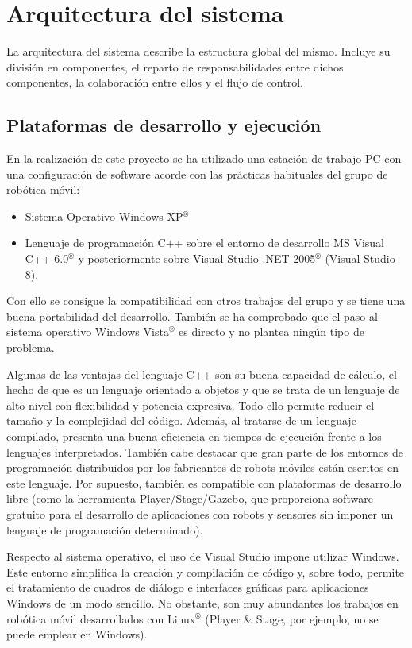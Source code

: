 
\chapter{Arquitectura del sistema}

La arquitectura del sistema describe la estructura global del mismo. Incluye su división en componentes, el reparto de responsabilidades entre dichos componentes, la colaboración entre ellos y el flujo de control.
\section{Plataformas de desarrollo y ejecución}

En la realización de este proyecto se ha utilizado una estación de trabajo PC con una configuración de software acorde con las prácticas habituales del grupo de robótica móvil:

\begin{itemize}
  \item Sistema Operativo Windows XP$^{®}$
  \item Lenguaje de programación C++ sobre el entorno de desarrollo MS Visual C++ 6.0$^{®}$ y posteriormente sobre Visual Studio .NET 2005$^{®}$ (Visual Studio 8).
\end{itemize}

Con ello se consigue la compatibilidad con otros trabajos del grupo y se tiene una buena portabilidad del desarrollo. También se ha comprobado que el paso al sistema operativo Windows Vista$^{®}$ es directo y no plantea ningún tipo de problema.

Algunas de las ventajas del lenguaje C++ son su buena capacidad de cálculo, el hecho de que es un lenguaje orientado a objetos y que se trata de un lenguaje de alto nivel con flexibilidad y potencia expresiva. Todo ello permite reducir el tamaño y la complejidad del código. Además, al tratarse de un lenguaje compilado, presenta una buena eficiencia en tiempos de ejecución frente a los lenguajes interpretados. También cabe destacar que gran parte de los entornos de programación distribuidos por los fabricantes de robots móviles están escritos en este lenguaje. Por supuesto, también es compatible con plataformas de desarrollo libre (como la herramienta Player/Stage/Gazebo, que proporciona software gratuito para el desarrollo de aplicaciones con robots y sensores sin imponer un lenguaje de programación determinado).

Respecto al sistema operativo, el uso de Visual Studio impone utilizar Windows. Este entorno simplifica la creación y compilación de código y, sobre todo, permite el tratamiento de cuadros de diálogo e interfaces gráficas para aplicaciones Windows de un modo sencillo. No obstante, son muy abundantes los trabajos en robótica móvil desarrollados con Linux$^{®}$ (Player \& Stage, por ejemplo, no se puede emplear en Windows).

